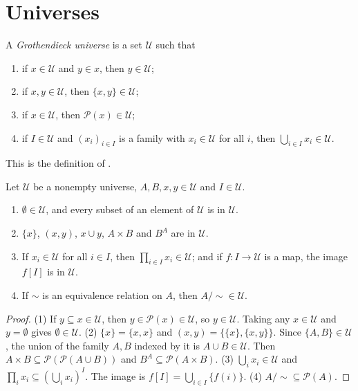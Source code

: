 \section{Universes}\label{sets:section-universes}

\begin{definition}\label{sets:definition-universe}
A \emph{Grothendieck universe} is a set $\mathcal{U}$ such that
\begin{enumerate}
\item if $x \in \mathcal{U}$ and $y \in x$, then $y \in \mathcal{U}$;
\item if $x, y \in \mathcal{U}$, then $\{x, y\} \in \mathcal{U}$;
\item if $x \in \mathcal{U}$, then $\mathcal{P}(x) \in \mathcal{U}$;
\item if $I \in \mathcal{U}$ and $(x_i)_{i \in I}$ is a family with
$x_i \in \mathcal{U}$ for all $i$, then $\bigcup_{i \in I} x_i \in \mathcal{U}$.
\end{enumerate}
\end{definition}

This is the definition of \cite[Expos\'e I, Appendice]{sga4-1}.

\begin{lemma}\label{sets:lemma-universe-closure}
Let $\mathcal{U}$ be a nonempty universe, $A, B, x, y \in \mathcal{U}$ and
$I \in \mathcal{U}$.
\begin{enumerate}
\item $\emptyset \in \mathcal{U}$, and every subset of an element of
$\mathcal{U}$ is in $\mathcal{U}$.
\item $\{x\}$, $(x, y)$, $x \cup y$, $A \times B$ and $B^A$ are in $\mathcal{U}$.
\item If $x_i \in \mathcal{U}$ for all $i \in I$, then
$\prod_{i \in I} x_i \in \mathcal{U}$; and if $f \colon I \to \mathcal{U}$ is a
map, the image $f[I]$ is in $\mathcal{U}$.
\item If $\sim$ is an equivalence relation on $A$, then $A/{\sim} \in \mathcal{U}$.
\end{enumerate}
\end{lemma}

\begin{proof}
(1) If $y \subseteq x \in \mathcal{U}$, then $y \in \mathcal{P}(x) \in \mathcal{U}$,
so $y \in \mathcal{U}$. Taking any $x \in \mathcal{U}$ and $y = \emptyset$ gives
$\emptyset \in \mathcal{U}$.
(2) $\{x\} = \{x, x\}$ and $(x, y) = \{\{x\}, \{x, y\}\}$. Since
$\{A, B\} \in \mathcal{U}$, the union of the family $A, B$ indexed by it is
$A \cup B \in \mathcal{U}$. Then $A \times B \subseteq \mathcal{P}(\mathcal{P}(A \cup B))$
and $B^A \subseteq \mathcal{P}(A \times B)$.
(3) $\bigcup_i x_i \in \mathcal{U}$ and
$\prod_i x_i \subseteq (\bigcup_i x_i)^I$. The image is
$f[I] = \bigcup_{i \in I} \{f(i)\}$.
(4) $A/{\sim} \subseteq \mathcal{P}(A)$.
\end{proof}

